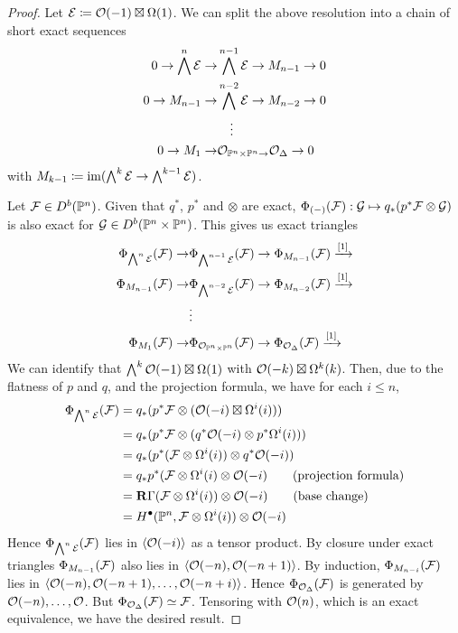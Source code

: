 \begin{proof}
    Let $\mathcal{E}\coloneqq\mathcal{O}(-1)\boxtimes\Omega(1)$.
    We can split the above resolution into a chain of short exact sequences
    \begin{align*}
        0 \to \bigwedge^{n}\mathcal{E} \to &\bigwedge^{n-1}\mathcal{E}\to M_{n-1}\to 0  \\
        0\to M_{n-1}\to & \bigwedge^{n-2}\mathcal{E}\to M_{n-2}\to 0  \\
        &\quad\vdots \\
        0\to M_{1}\to &\mathcal{O}_{\mathbb{P}^{n}\times \mathbb{P}^{n}\to}\mathcal{O}_{\Delta}\to 0
    \end{align*}
    with $M_{k-1}\coloneqq\operatorname{im}(\bigwedge^{k}\mathcal{E} \to \bigwedge^{k-1}\mathcal{E})$.

    Let $\mathcal{F}\in D^b(\mathbb{P}^n)$. Given that $q^*$, $p^*$ and $\otimes$ are exact, $\Phi_{(-)}(\mathcal{F}):\mathcal{G}\mapsto q_{*}(p^{*}\mathcal{F}\otimes\mathcal{G})$ is also exact for $\mathcal{G} \in D^b(\mathbb{P}^n\times \mathbb{P}^n)$. This gives us exact triangles
    \begin{align*}
        \Phi_{\bigwedge^{n}\mathcal{E}}(\mathcal{F}) \to &\Phi_{\bigwedge^{n-1}\mathcal{E}} (\mathcal{F})\to \Phi_{M_{n-1}}(\mathcal{F})\xrightarrow{[1]}   \\
        \Phi_{M_{n-1}}(\mathcal{F})\to & \Phi_{\bigwedge^{n-2}\mathcal{E}} (\mathcal{F})\to \Phi_{M_{n-2}}(\mathcal{F})\xrightarrow{[1]}  \\
        &\vdots \\
        \Phi_{M_{1}}(\mathcal{F})\to &\Phi_{\mathcal{O}_{\mathbb{P}^n\times\mathbb{P}^n} }(\mathcal{F})\to \Phi_{\mathcal{O}_{\Delta}} (\mathcal{F})\xrightarrow{[1]}
    \end{align*}
    We can identify that $\bigwedge^{k}\mathcal{O}(-1)\boxtimes\Omega(1)$ with $\mathcal{O}(-k)\boxtimes\Omega^k(k)$. Then, due to the flatness of $p$ and $q$, and the projection formula, we have for each $i \leq n$,
    \begin{align*}
        \Phi_{\bigwedge^n\mathcal{E}}(\mathcal{F})
            &= q_*(p^*\mathcal{F}\otimes(\mathcal{O}(-i)\boxtimes\Omega^i(i))) \\
            &= q_*(p^*\mathcal{F}\otimes(q^*\mathcal{O}(-i)\otimes p^*\Omega^i(i))) \\
            &= q_*(p^*(\mathcal{F}\otimes\Omega^i(i))\otimes q^*\mathcal{O}(-i)) \\
            &= q_*p^*(\mathcal{F}\otimes\Omega^i(i)\otimes\mathcal{O}(-i)
                \qquad \text{(projection formula)} \\
            &= \operatorname{\mathbf{R}\Gamma}(\mathcal{F}\otimes\Omega^i(i))\otimes\mathcal{O}(-i)
                \qquad \text{(base change)} \\
            &= H^\bullet(\mathbb{P}^n,\mathcal{F}\otimes\Omega^i(i))\otimes\mathcal{O}(-i)
    \end{align*}
    Hence $\Phi_{\bigwedge^{n}\mathcal{E}} (\mathcal{F})$ lies in $\langle\mathcal{O}(-i)\rangle$ as a tensor product. By closure under exact triangles $\Phi_{M_{n-1}}(\mathcal{F})$ also lies in $\langle\mathcal{O}(-n),\mathcal{O}(-n+1)\rangle$. By induction, $\Phi_{M_{n-i}}(\mathcal{F})$ lies in $\langle\mathcal{O}(-n),\mathcal{O}(-n+1),\dots,\mathcal{O}(-n+i)\rangle$. Hence $\Phi_{\mathcal{O}_\Delta}(\mathcal{F})$ is generated by $\mathcal{O}(-n),\dots,\mathcal{O}$. But $\Phi_{\mathcal{O}_\Delta}(\mathcal{F})\simeq\mathcal{F}$. Tensoring with $\mathcal{O}(n)$, which is an exact equivalence, we have the desired result.
\end{proof}


